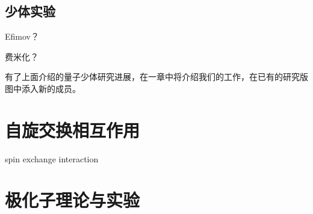 \subsection{少体实验}

Efimov？

费米化？

有了上面介绍的量子少体研究进展，在一章中将介绍我们的工作，在已有的研究版图中添入新的成员。

\section{自旋交换相互作用}\label{sec:spin-exchange}
spin exchange interaction

\section{极化子理论与实验}


